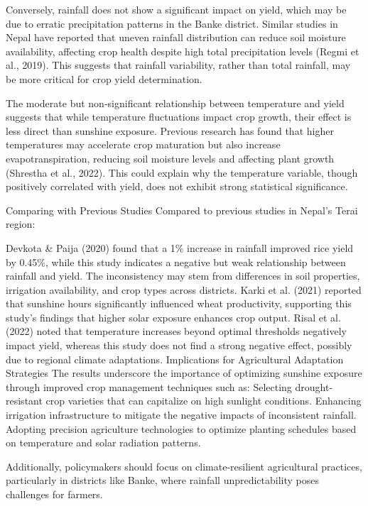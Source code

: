 Conversely, rainfall does not show a significant impact on yield, which may be due to erratic precipitation patterns in the Banke district. Similar studies in Nepal have reported that uneven rainfall distribution can reduce soil moisture availability, affecting crop health despite high total precipitation levels (Regmi et al., 2019). This suggests that rainfall variability, rather than total rainfall, may be more critical for crop yield determination.

The moderate but non-significant relationship between temperature and yield suggests that while temperature fluctuations impact crop growth, their effect is less direct than sunshine exposure. Previous research has found that higher temperatures may accelerate crop maturation but also increase evapotranspiration, reducing soil moisture levels and affecting plant growth (Shrestha et al., 2022). This could explain why the temperature variable, though positively correlated with yield, does not exhibit strong statistical significance.

Comparing with Previous Studies
Compared to previous studies in Nepal’s Terai region:

Devkota \& Paija (2020) found that a 1\% increase in rainfall improved rice yield by 0.45\%, while this study indicates a negative but weak relationship between rainfall and yield. The inconsistency may stem from differences in soil properties, irrigation availability, and crop types across districts.
Karki et al. (2021) reported that sunshine hours significantly influenced wheat productivity, supporting this study’s findings that higher solar exposure enhances crop output.
Risal et al. (2022) noted that temperature increases beyond optimal thresholds negatively impact yield, whereas this study does not find a strong negative effect, possibly due to regional climate adaptations.
Implications for Agricultural Adaptation Strategies
The results underscore the importance of optimizing sunshine exposure through improved crop management techniques such as:
Selecting drought-resistant crop varieties that can capitalize on high sunlight conditions.
Enhancing irrigation infrastructure to mitigate the negative impacts of inconsistent rainfall.
Adopting precision agriculture technologies to optimize planting schedules based on temperature and solar radiation patterns.

Additionally, policymakers should focus on climate-resilient agricultural practices, particularly in districts like Banke, where rainfall unpredictability poses challenges for farmers.

